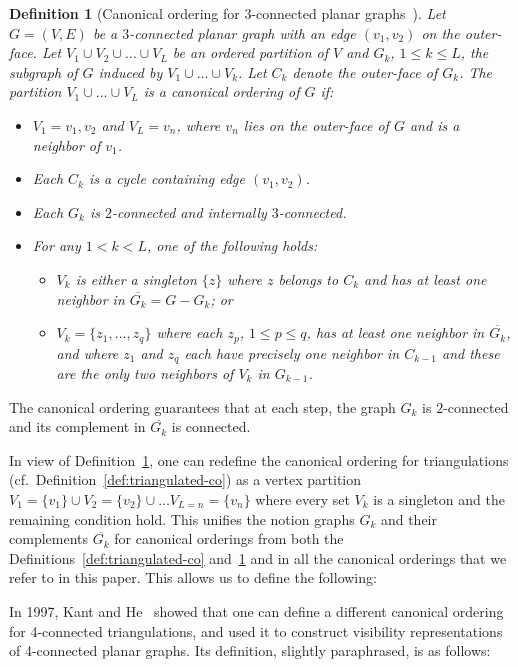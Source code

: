 \documentclass[12pt]{article}
\newtheorem{definition}{Definition}
\begin{document}
\begin{definition}[Canonical ordering for $3$-connected planar graphs~\cite{Kant96}]
\label{def:triconnected-co}
Let $G = (V,E)$ be a $3$-connected planar graph with an edge $(v_1, v_2)$ on the outer-face. Let $V_1 \cup V_2 \cup \ldots \cup V_L$ be an ordered partition of $V$ and $G_k$, $1 \leq k \leq L$, the subgraph of $G$ induced by $V_1 \cup \ldots \cup V_k$. Let $C_k$ denote the outer-face of $G_k$. The partition $V_1 \cup \ldots \cup V_L$ is a \emph{canonical ordering} of $G$ if:
\begin{itemize}
\item $V_1 = {v_1 , v_2}$ and $V_L = {v_n}$, where $v_n$ lies on the outer-face of $G$ and is a neighbor of $v_1$.
\item Each $C_k$ is a cycle containing edge $(v_1,v_2)$.
\item Each $G_k$ is $2$-connected and internally $3$-connected.
\item For any $1 < k < L$, one of the following holds:
\begin{itemize}
\item $V_k$ is either a singleton $\{z\}$ where $z$ belongs to $C_k$ and has at least one neighbor in $\overline{G_k} = G - G_k$; or
\item $V_k = \{z_1, \ldots, z_q\}$ where each $z_p$, $1 \leq p \leq q$, has at least one neighbor in $\overline{G_k}$, and where $z_1$ and $z_q$ each have precisely one neighbor in $C_{k-1}$ and these are the only two neighbors of $V_k$ in $G_{k-1}$.
\end{itemize}
\end{itemize}
\end{definition}
The canonical ordering guarantees that at each step, the graph $G_k$ is $2$-connected and its complement in $\overline{G_k}$ is connected. 

In view of Definition~\ref{def:triconnected-co}, one can redefine the canonical ordering for triangulations (cf.~Definition~\ref{def:triangulated-co}) as a vertex partition $V_1 = \{v_1\} \cup V_2 = \{v_2\} \cup \ldots V_{L=n} = \{v_n\}$ where every set $V_k$ is a singleton and the remaining condition hold. This unifies the notion graphs $G_k$ and their complements $\overline{G_k}$ for canonical orderings from both the Definitions~\ref{def:triangulated-co} and~\ref{def:triconnected-co} and in all the canonical orderings that we refer to in this paper. This allows us to define the following:
\fi

In 1997, Kant and He~\cite{KH97} showed that one can define a different canonical ordering for 4-connected triangulations, and used it to construct visibility representations of 4-connected planar graphs. 
Its definition, slightly paraphrased, is as follows:
\end{document}
